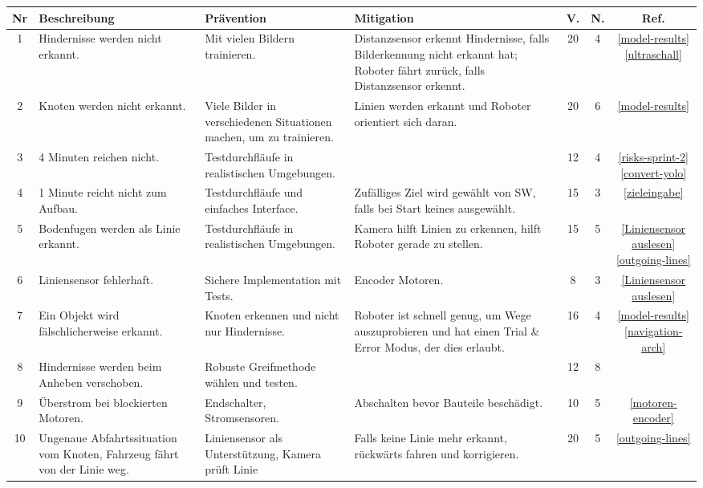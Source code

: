 \begin{table}[H]
\centering
\small
\begin{tabularx}{\textwidth}{|c|X|X|X|c|c|c|}
\hline
  \textbf{Nr} & \textbf{Beschreibung} & \textbf{Prävention} & \textbf{Mitigation} & \textbf{V.} & \textbf{N.} & \textbf{Ref.}\\
  \hline
      1&Hindernisse werden nicht erkannt. &Mit vielen Bildern trainieren.& Distanzsensor erkennt Hindernisse, falls Bilderkennung nicht erkannt hat; Roboter fährt zurück, falls Distanzsensor erkennt.&20&4& \makecell{\ref{model-results}\\ \ref{ultraschall}} \\
  \hline
2&Knoten werden nicht erkannt. &Viele Bilder in verschiedenen Situationen machen, um zu trainieren.&Linien werden erkannt und Roboter orientiert sich daran.&20& 6&\ref{model-results}\\
  \hline
      3&4 Minuten reichen nicht. &Testdurchfläufe in realistischen Umgebungen.&&12&4 &\makecell{\ref{risks-sprint-2}\\ \ref{convert-yolo}}\\
  \hline
      4& 1 Minute reicht nicht zum Aufbau.& Testdurchfläufe und einfaches Interface.&Zufälliges Ziel wird gewählt von SW, falls bei Start keines ausgewählt.&15&3 &\ref{zieleingabe}\\
  \hline
      5&Bodenfugen werden als Linie erkannt. & Testdurchfläufe in realistischen Umgebungen.&Kamera hilft Linien zu erkennen, hilft Roboter gerade zu stellen.&15&5& \makecell{\ref{Liniensensor auslesen} \\ \ref{outgoing-lines}}\\
  \hline
      6& Liniensensor fehlerhaft. &Sichere Implementation mit Tests.& Encoder Motoren.&8&3 &\ref{Liniensensor auslesen}\\
  \hline
      7& Ein Objekt wird fälschlicherweise erkannt. &Knoten erkennen und nicht nur Hindernisse.&Roboter ist schnell genug, um Wege auszuprobieren und hat einen Trial \& Error Modus, der dies erlaubt.&16&4& \makecell{\ref{model-results} \\ \ref{navigation-arch}}
\\
  \hline
      8&Hindernisse werden beim Anheben verschoben. &Robuste Greifmethode wählen und testen.&&12&8& \\
  \hline
      9&Überstrom bei blockierten Motoren. &Endschalter, Stromsensoren.&Abschalten bevor Bauteile beschädigt.&10&5& \ref{motoren-encoder} \\
  \hline
      10&Ungenaue Abfahrtssituation vom Knoten, Fahrzeug fährt von der Linie weg. &Liniensensor als Unterstützung, Kamera prüft Linie& Falls keine Linie mehr erkannt, rückwärts fahren und korrigieren.&20&5& \ref{outgoing-lines}\\

\end{tabularx}
\end{table}
